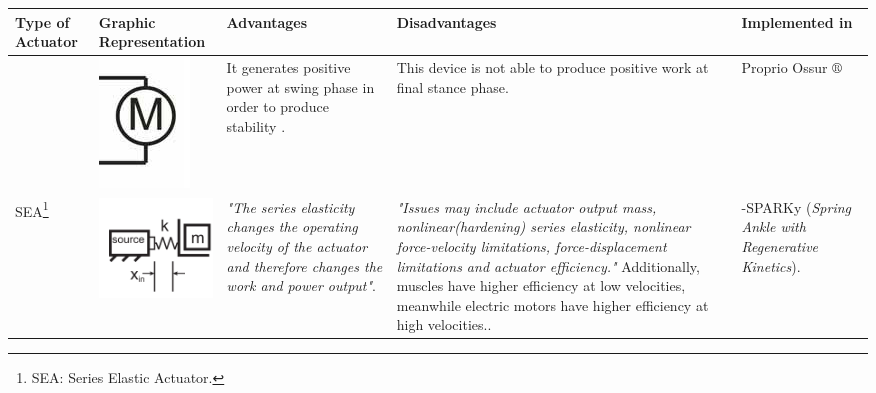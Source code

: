 \documentclass[12pt,english]{article}
\providecommand{\tabularnewline}{\\}
\begin{document}
\begin{center}
\begin{longtable}{|>{\centering}p{15mm}|>{\centering}p{30mm}|>{\centering}p{40mm}|>{\centering}p{40mm}|>{\centering}p{24mm}|}
\hline
\hline 
\textbf{\small{}Type of Actuator} & \textbf{\small{}Graphic Representation} & \textbf{\small{}Advantages} & \textbf{\small{}Disadvantages} & \textbf{\small{}Implemented in}\tabularnewline
\hline
\endhead
\hline 
{\small{}\emph{Direct Drive} (Stiff Actuator)} & {\small{}\vspace{5 mm}}{\small \par}

{\small{}\includegraphics[scale=0.6]{DD.PNG}} & {\small{}It generates positive power at swing phase in order to produce stability \cite{Ossur}.} & {\small{}This device is not able to produce positive work at final stance phase\cite{herr2014powered}.} & {\small{}Proprio Ossur $\circledR$}\tabularnewline
\hline 
{\small{}SEA}\footnote{SEA: Series Elastic Actuator.}{\small{}
\nomenclature[Series Elastic Actuator]{SEA}{Series Elastic Actuator}} & {\small{}\vspace{10 mm}}{\small \par}

{\small{}\includegraphics[scale=0.7]{SEAmodel.PNG}} & {\small{}\emph{"The series elasticity changes the operating velocity of the actuator and therefore changes the work and power output"}\cite{Paluska2006a}.} & {\small{} \emph{"Issues may include actuator output mass, nonlinear(hardening) series elasticity, nonlinear force-velocity limitations, force-displacement limitations and actuator efficiency."} Additionally, muscles have higher efficiency at low velocities, meanwhile electric motors have higher efficiency at high velocities.\cite{Paluska2006a}.} & {\small{}-SPARKy (\emph{Spring Ankle with Regenerative Kinetics})\cite{Holgate2008,Bellman2008}.}{\small \par}


\end{longtable}
\end{center}
\end{document}
